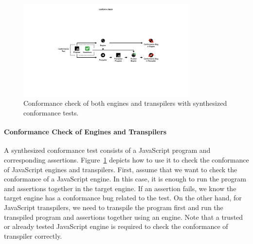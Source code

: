 \begin{figure}
  \includegraphics[width=0.8\textwidth]{img/conform-check}
  \caption{
    Conformance check of both engines and transpilers with synthesized
    conformance tests.
  }
  \label{fig:conform-check}
\end{figure}


\paragraph{\textbf{Conformance Check of Engines and Transpilers}}
%
A synthesized conformance test consists of a JavaScript program and
corresponding assertions.
%
Figure~\ref{fig:conform-check} depicts how to use it to check the conformance of
JavaScript engines and transpilers.
%
First, assume that we want to check the conformance of a JavaScript engine.
%
In this case, it is enough to run the program and assertions together in the
target engine.
%
If an assertion fails, we know the target engine has a conformance bug related
to the test.
%
On the other hand, for JavaScript transpilers, we need to transpile the program
first and run the transpiled program and assertions together using an engine.
%
Note that a trusted or already tested JavaScript engine is required to check the
conformance of transpiler correctly.
